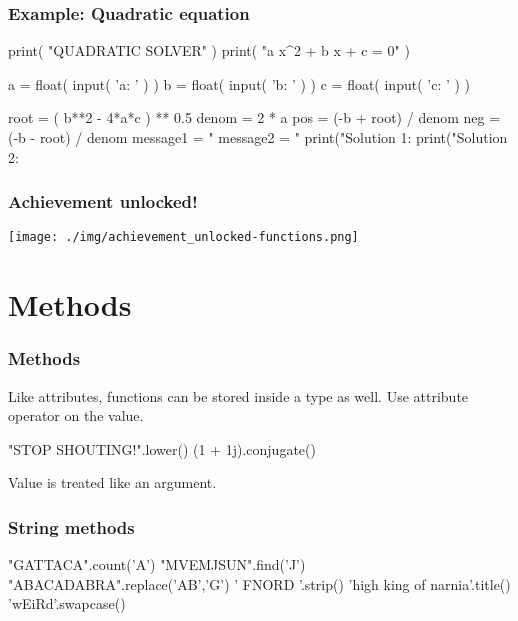 \documentclass[11pt]{beamer}
\begin{document}
\begin{frame}[fragile]
  \frametitle{Example:  Quadratic equation}

  \begin{semiverbatim}
print( "QUADRATIC SOLVER" )
print( "a x^2 + b x + c = 0" )

a = float( input( 'a: ' ) )
b = float( input( 'b: ' ) )
c = float( input( 'c: ' ) )

root = ( b**2 - 4*a*c ) ** 0.5
denom = 2 * a
pos = (-b + root) / denom
neg = (-b - root) / denom
message1 = "%
message2 = "%
print("Solution 1: %
print("Solution 2: %
  \end{semiverbatim}
\end{frame}

\begin{frame}
  \frametitle{Achievement unlocked!}
  \texttt{[image: ./img/achievement\_unlocked-functions.png]}
\end{frame}

\section{Methods}

\begin{frame}[fragile]
  \frametitle{Methods}
  \Enlarge

  \begin{itemize}
  \myitem  Like attributes, functions can be stored inside a type as well. \pause
  \myitem  Use attribute operator on the value. \pause
    \begin{semiverbatim}
"STOP SHOUTING!".lower()
(1 + 1j).conjugate()
    \end{semiverbatim} \pause
  \myitem  Value is treated like an argument.
  \end{itemize}
\end{frame}

\begin{frame}[fragile]
  \frametitle{String methods}
  \Enlarge

  \begin{semiverbatim}
"GATTACA".count('A')
"MVEMJSUN".find('J')
"ABACADABRA".replace('AB','G')
' FNORD '.strip()
'high king of narnia'.title()
'wEiRd'.swapcase()
  \end{semiverbatim}
\end{frame}
\end{document}
